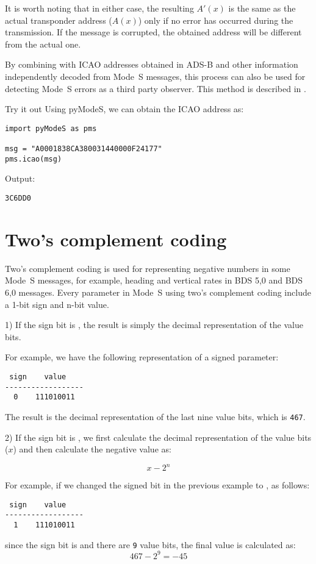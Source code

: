 It is worth noting that in either case, the resulting $A'(x)$ is the same as the actual transponder address ($A(x)$) only if no error has occurred during the transmission. If the message is corrupted, the obtained address will be different from the actual one.

By combining with ICAO addresses obtained in ADS-B and other information independently decoded from Mode~S messages, this process can also be used for detecting Mode~S errors as a third party observer. This method is described in \cite{sun2019pymodes}.

\begin{notebox}{Try it out}
Using pyModeS, we can obtain the ICAO address as: 

\begin{verbatim}
import pyModeS as pms

msg = "A0001838CA380031440000F24177"
pms.icao(msg)
\end{verbatim}

Output: 

\begin{verbatim}
3C6DD0
\end{verbatim}

\end{notebox}

\section{Two's complement coding} \label{sec:two_complement}

Two's complement coding is used for representing negative numbers in some Mode~S messages, for example, heading and vertical rates in BDS 5,0 and BDS 6,0 messages. Every parameter in Mode~S using two's complement coding include a 1-bit sign and n-bit value.

1) If the sign bit is \0, the result is simply the decimal representation of the value bits.

For example, we have the following representation of a signed parameter:

\begin{verbatim}
 sign    value
------------------
  0    111010011
\end{verbatim}

The result is the decimal representation of the last nine value bits, which is \texttt{467}.


2) If the sign bit is \1, we first calculate the decimal representation of the value bits ($x$) and then calculate the negative value as:

\begin{equation}
  x - 2^n
\end{equation}

For example, if we changed the signed bit in the previous example to \1, as follows:

\begin{verbatim}
 sign    value
------------------
  1    111010011
\end{verbatim}

since the sign bit is \1 and there are \texttt{9} value bits, the final value is calculated as:
\begin{equation}
  467 - 2^9 = -45
\end{equation}
